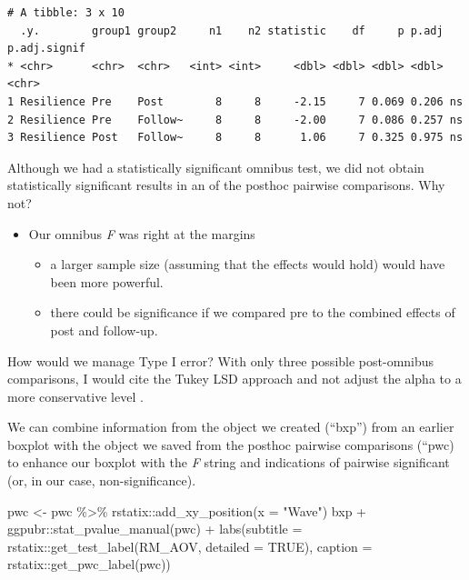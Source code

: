 \documentclass[
  11pt,
]{book}
\newenvironment{Shaded}{\begin{snugshade}}{\end{snugshade}}
\newcommand{\AttributeTok}[1]{\textcolor[rgb]{0.77,0.63,0.00}{#1}}
\newcommand{\ConstantTok}[1]{\textcolor[rgb]{0.00,0.00,0.00}{#1}}
\newcommand{\FunctionTok}[1]{\textcolor[rgb]{0.00,0.00,0.00}{#1}}
\newcommand{\NormalTok}[1]{#1}
\newcommand{\OtherTok}[1]{\textcolor[rgb]{0.56,0.35,0.01}{#1}}
\newcommand{\SpecialCharTok}[1]{\textcolor[rgb]{0.00,0.00,0.00}{#1}}
\newcommand{\StringTok}[1]{\textcolor[rgb]{0.31,0.60,0.02}{#1}}
\providecommand{\tightlist}{%
  \setlength{\itemsep}{0pt}\setlength{\parskip}{0pt}}
\begin{document}
\begin{verbatim}
# A tibble: 3 x 10
  .y.        group1 group2     n1    n2 statistic    df     p p.adj p.adj.signif
* <chr>      <chr>  <chr>   <int> <int>     <dbl> <dbl> <dbl> <dbl> <chr>       
1 Resilience Pre    Post        8     8     -2.15     7 0.069 0.206 ns          
2 Resilience Pre    Follow~     8     8     -2.00     7 0.086 0.257 ns          
3 Resilience Post   Follow~     8     8      1.06     7 0.325 0.975 ns          
\end{verbatim}

Although we had a statistically significant omnibus test, we did not obtain statistically significant results in an of the posthoc pairwise comparisons. Why not?

\begin{itemize}
\tightlist
\item
  Our omnibus \emph{F} was right at the margins

  \begin{itemize}
  \tightlist
  \item
    a larger sample size (assuming that the effects would hold) would have been more powerful.
  \item
    there could be significance if we compared pre to the combined effects of post and follow-up.
  \end{itemize}
\end{itemize}

How would we manage Type I error? With only three possible post-omnibus comparisons, I would cite the Tukey LSD approach and not adjust the alpha to a more conservative level \citep{green_using_2014}.

We can combine information from the object we created (``bxp'') from an earlier boxplot with the object we saved from the posthoc pairwise comparisons (``pwc) to enhance our boxplot with the \emph{F} string and indications of pairwise significant (or, in our case, non-significance).

\begin{Shaded}
\begin{Highlighting}[]
\NormalTok{pwc }\OtherTok{\textless{}{-}}\NormalTok{ pwc }\SpecialCharTok{\%\textgreater{}\%}
\NormalTok{    rstatix}\SpecialCharTok{::}\FunctionTok{add\_xy\_position}\NormalTok{(}\AttributeTok{x =} \StringTok{"Wave"}\NormalTok{)}
\NormalTok{bxp }\SpecialCharTok{+}\NormalTok{ ggpubr}\SpecialCharTok{::}\FunctionTok{stat\_pvalue\_manual}\NormalTok{(pwc) }\SpecialCharTok{+} \FunctionTok{labs}\NormalTok{(}\AttributeTok{subtitle =}\NormalTok{ rstatix}\SpecialCharTok{::}\FunctionTok{get\_test\_label}\NormalTok{(RM\_AOV,}
    \AttributeTok{detailed =} \ConstantTok{TRUE}\NormalTok{), }\AttributeTok{caption =}\NormalTok{ rstatix}\SpecialCharTok{::}\FunctionTok{get\_pwc\_label}\NormalTok{(pwc))}
\end{Highlighting}
\end{Shaded}
\end{document}
